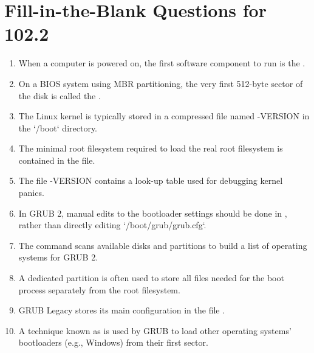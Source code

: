 \documentclass[a4paper]{report}
\begin{document}
\newpage
\section*{Fill-in-the-Blank Questions for 102.2}

\begin{enumerate}[1.]

\item When a computer is powered on, the first software component to run is the \underline{\hspace{2cm}}.

\item On a BIOS system using MBR partitioning, the very first 512-byte sector of the disk is called the \underline{\hspace{2cm}}.

\item The Linux kernel is typically stored in a compressed file named \underline{\hspace{2cm}}-VERSION in the `/boot` directory.

\item The minimal root filesystem required to load the real root filesystem is contained in the \underline{\hspace{2cm}} file.

\item The file \underline{\hspace{2cm}}-VERSION contains a look-up table used for debugging kernel panics.

\item In GRUB 2, manual edits to the bootloader settings should be done in \underline{\hspace{2cm}}, rather than directly editing `/boot/grub/grub.cfg`.

\item The \underline{\hspace{2cm}} command scans available disks and partitions to build a list of operating systems for GRUB 2.

\item A dedicated \underline{\hspace{2cm}} partition is often used to store all files needed for the boot process separately from the root filesystem.

\item GRUB Legacy stores its main configuration in the file \underline{\hspace{2cm}}.

\item A technique known as \underline{\hspace{2cm}} is used by GRUB to load other operating systems’ bootloaders (e.g., Windows) from their first sector.

\end{enumerate}
\end{document}
